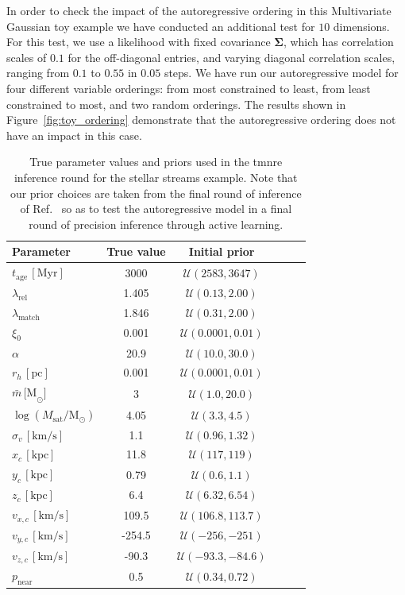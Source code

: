 \begin{subappendices}
In order to check the impact of the autoregressive ordering in this Multivariate Gaussian toy example we have conducted an additional test for $10$ dimensions. For this test, we use a likelihood with fixed covariance $\mathbf{\Sigma}$, which has correlation scales of $0.1$ for the off-diagonal entries, and varying diagonal correlation scales, ranging from $0.1$ to $0.55$ in $0.05$ steps. We have run our autoregressive model for four different variable orderings: from most constrained to least, from least constrained to most, and two random orderings. The results shown in Figure~\ref{fig:toy_ordering} demonstrate that the autoregressive ordering does not have an impact in this case.

\begin{table}
    \centering
    \renewcommand{\arraystretch}{1.2}
    \begin{tabular}{l c c c c r}
        \hline
        Parameter & True value & Initial prior  \\
        \hline
        $t_\mathrm{age}\,\mathrm{[Myr]}$ & 3000 & $\mathcal{U}(2583, 3647)$ \\
        $\lambda_\mathrm{rel}$ & 1.405 & $\mathcal{U}(0.13, 2.00)$ \\
        $\lambda_\mathrm{match}$ & 1.846 & $\mathcal{U}(0.31, 2.00)$ \\
        $\xi_0$ & 0.001 & $\mathcal{U}(0.0001,0.01)$ \\
        $\alpha$ & 20.9 & $\mathcal{U}(10.0, 30.0)$ \\
        $r_h \, \mathrm{[pc]}$ & 0.001 & $\mathcal{U}(0.0001, 0.01)$ \\
        $\bar{m}\,\mathrm{[M}_\odot\mathrm{]}$ & 3 & $\mathcal{U}(1.0, 20.0)$ \\
        $\log(M_\mathrm{sat}/\mathrm{M}_\odot)$ & 4.05 & $\mathcal{U}(3.3, 4.5)$ \\
        $\sigma_v \,\mathrm{[km/s]}$ & 1.1 & $\mathcal{U}(0.96, 1.32)$ \\
        $x_c\,\mathrm{[kpc]}$ & 11.8 & $\mathcal{U}(117, 119)$ \\
        $y_c\,\mathrm{[kpc]}$ & 0.79 & $\mathcal{U}(0.6, 1.1)$ \\
        $z_c\,\mathrm{[kpc]}$ & 6.4 & $\mathcal{U}(6.32, 6.54)$ \\
        $v_{x,c}\,\mathrm{[km/s]}$ & 109.5 & $\mathcal{U}(106.8, 113.7)$ \\
        $v_{y,c}\,\mathrm{[km/s]}$ & -254.5 & $\mathcal{U}(-256, -251)$ \\
        $v_{z,c}\,\mathrm{[km/s]}$ & -90.3 & $\mathcal{U}(-93.3,-84.6)$ \\
        $p_\mathrm{near}$ & 0.5 & $\mathcal{U}(0.34, 0.72)$ \\
        \hline
    \end{tabular}
    \caption{True parameter values and priors used in the \gls*{tmnre} inference round for the stellar streams example. Note that our prior choices are taken from the final round of inference of Ref.~\protect\cite{Alvey:2023pkx} so as to test the autoregressive model in a final round of precision inference through active learning.}
    \label{tab:anre-streams-params}
\end{table}


\end{subappendices}

